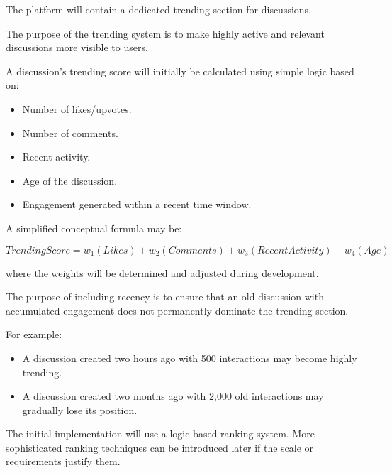 \documentclass[11pt,a4paper]{article}
\begin{document}
The platform will contain a dedicated trending section for discussions.

The purpose of the trending system is to make highly active and relevant discussions more visible to users.

A discussion's trending score will initially be calculated using simple logic based on:

\begin{itemize}

    \item Number of likes/upvotes.

    \item Number of comments.

    \item Recent activity.

    \item Age of the discussion.

    \item Engagement generated within a recent time window.

\end{itemize}

A simplified conceptual formula may be:

\[
TrendingScore =
w_1(Likes) +
w_2(Comments) +
w_3(RecentActivity) -
w_4(Age)
\]

where the weights will be determined and adjusted during development.

The purpose of including recency is to ensure that an old discussion with accumulated engagement does not permanently dominate the trending section.

For example:

\begin{itemize}

    \item A discussion created two hours ago with 500 interactions may become highly trending.

    \item A discussion created two months ago with 2,000 old interactions may gradually lose its position.

\end{itemize}

The initial implementation will use a logic-based ranking system. More sophisticated ranking techniques can be introduced later if the scale or requirements justify them.


\end{document}
